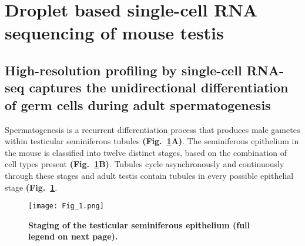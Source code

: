 
\section{Droplet based single-cell RNA sequencing of mouse testis}
\subsection*{High-resolution profiling by single-cell RNA-seq captures the unidirectional differentiation of germ cells during adult spermatogenesis}

Spermatogenesis is a recurrent differentiation process that produces male gametes within testicular seminiferous tubules \textbf{(Fig.~\ref{fig3:cell_staging}A)}. The seminiferous epithelium in the mouse is classified into twelve distinct stages, based on the combination of cell types present \textbf{(Fig.~\ref{fig3:cell_staging}B)}. Tubules cycle asynchronously and continuously through these stages and adult testis contain tubules in every possible epithelial stage \textbf{(Fig.~\ref{fig3:cell_staging}}. \\

\begin{figure}[!h]
\centering
\texttt{[image: Fig\_1.png]}
\caption[Staging of the testicular seminiferous epithelium]{\textbf{Staging of the testicular seminiferous epithelium (full legend on next page).}\\}
\label{fig3:cell_staging}
\end{figure}

\newpage

